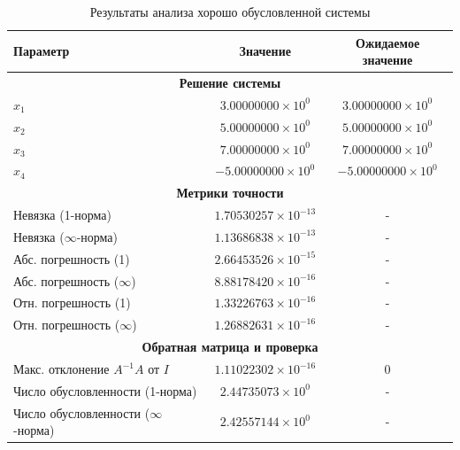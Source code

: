\documentclass[12pt, a4paper]{article}
\begin{document}
\begin{table}[h]
\centering
\caption{Результаты анализа хорошо обусловленной системы}
\begin{tabular}{|l|c|c|}
\hline
\textbf{Параметр} & \textbf{Значение} & \textbf{Ожидаемое значение} \\
\hline
\multicolumn{3}{|c|}{\textbf{Решение системы}} \\
\hline
$x_1$ & $3.00000000 \times 10^0$ & $3.00000000 \times 10^0$ \\
$x_2$ & $5.00000000 \times 10^0$ & $5.00000000 \times 10^0$ \\
$x_3$ & $7.00000000 \times 10^0$ & $7.00000000 \times 10^0$ \\
$x_4$ & $-5.00000000 \times 10^0$ & $-5.00000000 \times 10^0$ \\
\hline
\multicolumn{3}{|c|}{\textbf{Метрики точности}} \\
\hline
Невязка (1-норма) & $1.70530257 \times 10^{-13}$ & - \\
Невязка ($\infty$-норма) & $1.13686838 \times 10^{-13}$ & - \\
Абс. погрешность (1) & $2.66453526 \times 10^{-15}$ & - \\
Абс. погрешность ($\infty$) & $8.88178420 \times 10^{-16}$ & - \\
Отн. погрешность (1) & $1.33226763 \times 10^{-16}$ & - \\
Отн. погрешность ($\infty$) & $1.26882631 \times 10^{-16}$ & - \\
\hline
\multicolumn{3}{|c|}{\textbf{Обратная матрица и проверка}} \\
\hline
Макс. отклонение $A^{-1}A$ от $I$ & $1.11022302 \times 10^{-16}$ & 0 \\
Число обусловленности (1-норма) & $2.44735073 \times 10^0$ & - \\
Число обусловленности ($\infty$-норма) & $2.42557144 \times 10^0$ & - \\
\hline
\end{tabular}
\end{table}
\end{document}
